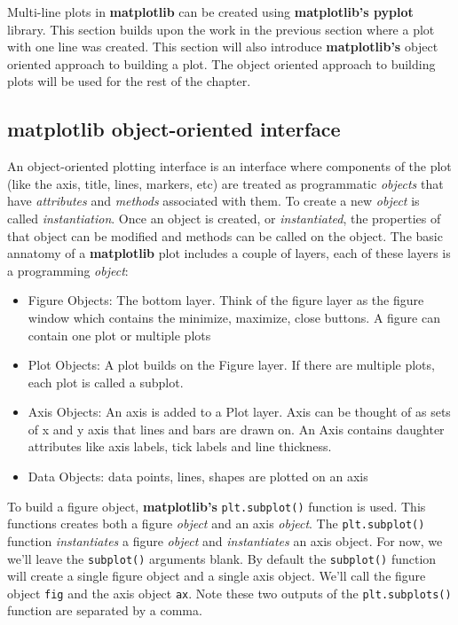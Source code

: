 \documentclass{book}
\providecommand{\tightlist}{%
      \setlength{\itemsep}{0pt}\setlength{\parskip}{0pt}}
\begin{document}
    Multi-line plots in \textbf{matplotlib} can be created using
\textbf{matplotlib's pyplot} library. This section builds upon the work
in the previous section where a plot with one line was created. This
section will also introduce \textbf{matplotlib's} object oriented
approach to building a plot. The object oriented approach to building
plots will be used for the rest of the chapter.

    \subsection{\texorpdfstring{\textbf{matplotlib} object-oriented
interface}{matplotlib object-oriented interface}}\label{matplotlib-object-oriented-interface}

An object-oriented plotting interface is an interface where components
of the plot (like the axis, title, lines, markers, etc) are treated as
programmatic \emph{objects} that have \emph{attributes} and
\emph{methods} associated with them. To create a new \emph{object} is
called \emph{instantiation}. Once an object is created, or
\emph{instantiated}, the properties of that object can be modified and
methods can be called on the object. The basic annatomy of a
\textbf{matplotlib} plot includes a couple of layers, each of these
layers is a programming \emph{object}:

\begin{itemize}
\tightlist
\item
  Figure Objects: The bottom layer. Think of the figure layer as the
  figure window which contains the minimize, maximize, close buttons. A
  figure can contain one plot or multiple plots
\item
  Plot Objects: A plot builds on the Figure layer. If there are multiple
  plots, each plot is called a subplot.
\item
  Axis Objects: An axis is added to a Plot layer. Axis can be thought of
  as sets of x and y axis that lines and bars are drawn on. An Axis
  contains daughter attributes like axis labels, tick labels and line
  thickness.
\item
  Data Objects: data points, lines, shapes are plotted on an axis
\end{itemize}

    To build a figure object, \textbf{matplotlib's}
\lstinline!plt.subplot()! function is used. This functions creates both
a figure \emph{object} and an axis \emph{object}. The
\lstinline!plt.subplot()! function \emph{instantiates} a figure
\emph{object} and \emph{instantiates} an axis object. For now, we we'll
leave the \lstinline!subplot()! arguments blank. By default the
\lstinline!subplot()! function will create a single figure object and a
single axis object. We'll call the figure object \lstinline!fig! and the
axis object \lstinline!ax!. Note these two outputs of the
\lstinline!plt.subplots()! function are separated by a comma.
\end{document}

